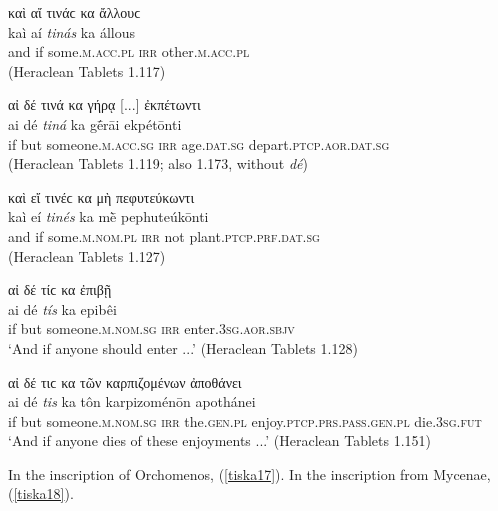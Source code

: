 \begin{exe}
\ex καὶ αἴ τινάϲ κα ἄλλουϲ\\
\gll kaì aí \emph{tinás} ka állous\\
and if some.\textsc{m.acc.pl} \textsc{irr} other.\textsc{m.acc.pl}\\ 
\trans (Heraclean Tablets 1.117)
\label{tiska12}
\end{exe}

\begin{exe}
\ex αἰ δέ τινά κα γήρᾳ {[}...{]} ἐκπέτωντι\\
\gll ai dé \emph{tiná} ka gḗrāi ekpétōnti\\
if but someone.\textsc{m.acc.sg} \textsc{irr} age.\textsc{dat.sg}
depart.\textsc{ptcp.aor.dat.sg}\\
\trans (Heraclean Tablets 1.119; also 1.173, without \textit{dé})
\label{tiska13}
\end{exe}

\begin{exe}
\ex καὶ εἴ τινέϲ κα μὴ πεφυτεύκωντι\\
\gll kaì eí \emph{tinés} ka mḕ pephuteúkōnti\\
and if some.\textsc{m.nom.pl} \textsc{irr} not plant.\textsc{ptcp.prf.dat.sg}\\
\trans (Heraclean Tablets 1.127)
\label{tiska14}
\end{exe}

\begin{exe}
\ex αἰ δέ τίϲ κα ἐπιβῇ\\
\gll ai dé \emph{tís} ka epibêi\\
if but someone.\textsc{m.nom.sg} \textsc{irr} enter.\textsc{3sg.aor.sbjv}\\
\trans `And if anyone should enter ...' (Heraclean Tablets 1.128)
\label{tiska15}
\end{exe}

\begin{exe}
\ex αἰ δέ τιϲ κα τῶν καρπιζομένων ἀποθάνει\\
\gll ai dé \emph{tis} ka tôn karpizoménōn apothánei\\ 
if but someone.\textsc{m.nom.sg} \textsc{irr} the.\textsc{gen.pl}
enjoy.\textsc{ptcp.prs.pass.gen.pl} die.\textsc{3sg.fut}\\
\trans `And if anyone dies of these enjoyments ...' (Heraclean Tablets 1.151)
\label{tiska16}
\end{exe}

In the inscription of Orchomenos, (\ref{tiska17}). In the inscription from Mycenae, (\ref{tiska18}).

